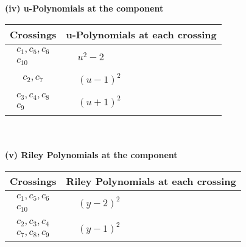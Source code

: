 \documentclass[1p]{elsarticle_modified}
\theoremstyle{definition}
\begin{document}
\newpage\renewcommand{\arraystretch}{1}
\flushleft \textbf{(iv) u-Polynomials at the component}\newline \\
\begin{tabular}{m{50pt}|m{274pt}}
Crossings & \hspace{64pt}u-Polynomials at each crossing \\
\hline $$\begin{aligned}c_{1},c_{5},c_{6}\\c_{10}\end{aligned}$$&$\begin{aligned}
&u^2-2
\end{aligned}$\\
\hline $$\begin{aligned}c_{2},c_{7}\end{aligned}$$&$\begin{aligned}
&(u-1)^2
\end{aligned}$\\
\hline $$\begin{aligned}c_{3},c_{4},c_{8}\\c_{9}\end{aligned}$$&$\begin{aligned}
&(u+1)^2
\end{aligned}$\\
\hline
\end{tabular}\\~\\
\newpage\renewcommand{\arraystretch}{1}
\flushleft \textbf{(v) Riley Polynomials at the component}\newline \\
\begin{tabular}{m{50pt}|m{274pt}}
Crossings & \hspace{64pt}Riley Polynomials at each crossing \\
\hline $$\begin{aligned}c_{1},c_{5},c_{6}\\c_{10}\end{aligned}$$&$\begin{aligned}
&(y-2)^2
\end{aligned}$\\
\hline $$\begin{aligned}c_{2},c_{3},c_{4}\\c_{7},c_{8},c_{9}\end{aligned}$$&$\begin{aligned}
&(y-1)^2
\end{aligned}$\\
\hline
\end{tabular}\\~\\
\end{document}
